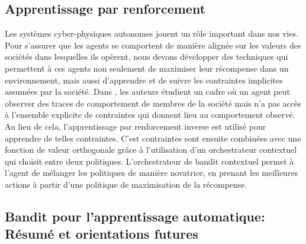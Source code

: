 \documentclass[conference]{IEEEtran}
\newcommand{\1}[1]{\mathbbm{1}_{\left\{#1\right\}}}
\begin{document}
\subsection{Apprentissage par renforcement}
 Les systèmes cyber-physiques autonomes jouent un rôle important dans nos vies. Pour s'assurer que les agents se comportent de manière alignée sur les valeurs des sociétés dans lesquelles ils opèrent, nous devons développer des techniques qui permettent à ces agents non seulement de maximiser leur récompense dans un environnement, mais aussi d'apprendre et de suivre les contraintes implicites assumées par la société. Dans \cite{noothigattu2018interpretable}, les auteurs étudient un cadre où un agent peut observer des traces de comportement de membres de la société mais n'a pas accès à l'ensemble explicite de contraintes qui donnent lieu au comportement observé. Au lieu de cela, l'apprentissage par renforcement inverse est utilisé pour apprendre de telles contraintes. C'est contraintes sont ensuite combinées avec une fonction de valeur orthogonale grâce à l'utilisation d'un orchestrateur contextuel qui choisit entre deux politiques. L'orchestrateur de bandit contextuel permet à l'agent de mélanger les politiques de manière novatrice, en prenant les meilleures actions à partir d'une politique de maximisation de la récompense. 

 
 \subsection{Bandit pour l'apprentissage automatique: \\ Résumé et orientations futures}
 
\end{document}
